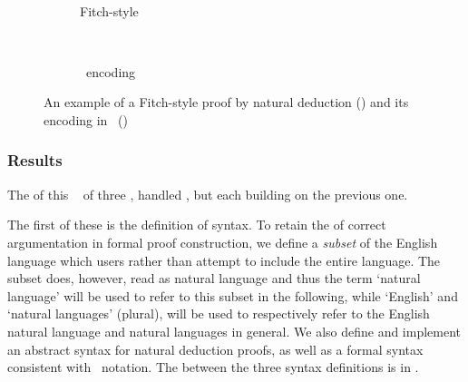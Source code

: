\documentclass[BA.tex]{subfiles}
\begin{document}
\begin{figure}[!ht]
\centering
\begin{subfigure}[t]{0.45\textwidth}
\scriptsize
~\\

\caption[]{Fitch-style}
\label{sf:fs}
\end{subfigure}
\(\qquad\)
\begin{subfigure}[t]{0.45\textwidth}
\scriptsize

\caption[]{\bp\ encoding}
\label{sf:boxin}
\end{subfigure}
\caption[Fitch-style proof and its \bp\ encoding]{An example of a
Fitch-style proof by natural deduction () and its encoding
in \bp\ ()}
\label{boxnfitch}
\end{figure}

\subsubsection{Results}
The  of this \tool\  of three ,
 handled , but each building on the previous one. 

 The first of these is the definition of syntax. To retain the  of correct argumentation
  in formal proof construction, we define a \emph{subset}
 of the English language  which users  
 rather than attempt to include the entire language. The subset does,
 however, read as natural language and thus the term
 `natural language' will be used to refer to this subset in the following,
 while `English'
 and `natural languages' (plural), will be used to respectively refer to
 the English natural language and natural languages in general. We also
 define and implement an abstract syntax for natural deduction proofs, as
 well as a formal syntax consistent with \bp\ notation.
 The  between the three syntax definitions is 
 in .
\end{document}
